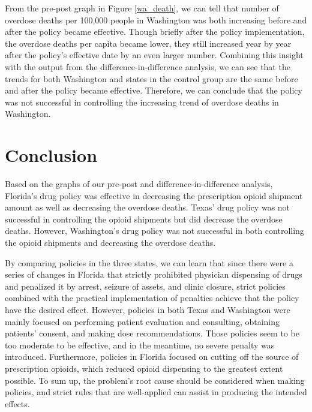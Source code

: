 \documentclass[12pt,letterpaper]{article}
\begin{document}
From the pre-post graph in Figure \ref{wa_death}, we can tell that number of overdose deaths per 100,000 people in Washington was both increasing before and after the policy became effective. Though briefly after the policy implementation, the overdose deaths per capita became lower, they still increased year by year after the policy's effective date by an even larger number. Combining this insight with the output from the difference-in-difference analysis, we can see that the trends for both Washington and states in the control group are the same before and after the policy became effective. Therefore, we can conclude that the policy was not successful in controlling the increasing trend of overdose deaths in Washington.


\section{Conclusion}

Based on the graphs of our pre-post and difference-in-difference analysis, Florida's drug policy was effective in decreasing the prescription opioid shipment amount as well as decreasing the overdose deaths. Texas' drug policy was not successful in controlling the opioid shipments but did decrease the overdose deaths. However, Washington's drug policy was not successful in both controlling the opioid shipments and decreasing the overdose deaths.

By comparing policies in the three states, we can learn that since there were a series of changes in Florida that strictly prohibited physician dispensing of drugs and penalized it by arrest, seizure of assets, and clinic closure, strict policies combined with the practical implementation of penalties achieve that the policy have the desired effect. However, policies in both Texas and Washington were mainly focused on performing patient evaluation and consulting, obtaining patients' consent, and making dose recommendations. Those policies seem to be too moderate to be effective, and in the meantime, no severe penalty was introduced. Furthermore, policies in Florida focused on cutting off the source of prescription opioids, which reduced opioid dispensing to the greatest extent possible. To sum up, the problem's root cause should be considered when making policies, and strict rules that are well-applied can assist in producing the intended effects.
\end{document}
